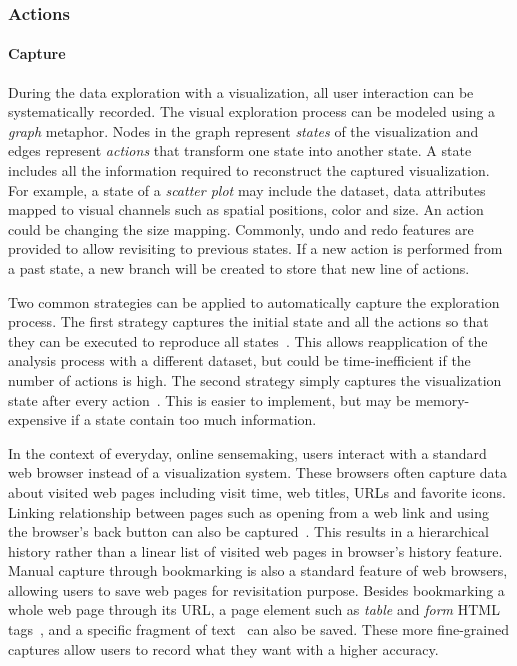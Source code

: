 \subsubsection{Actions}

\paragraph{Capture}
During the data exploration with a visualization, all user interaction can be systematically recorded. The visual exploration process can be modeled using a \textit{graph} metaphor. Nodes in the graph represent \textit{states} of the visualization and edges represent \textit{actions} that transform one state into another state. A state includes all the information required to reconstruct the captured visualization. For example, a state of a \textit{scatter plot} may include the dataset, data attributes mapped to visual channels such as spatial positions, color and size. An action could be changing the size mapping. Commonly, undo and redo features are provided to allow revisiting to previous states. If a new action is performed from a past state, a new branch will be created to store that new line of actions. 

Two common strategies can be applied to automatically capture the exploration process. The first strategy captures the initial state and all the actions so that they can be executed to reproduce all states~\cite{Kadivar2009}. This allows reapplication of the analysis process with a different dataset, but could be time-inefficient if the number of actions is high. The second strategy simply captures the visualization state after every action~\cite{Bavoil2005}. This is easier to implement, but may be memory-expensive if a state contain too much information.

In the context of everyday, online sensemaking, users interact with a standard web browser instead of a visualization system. These browsers often capture data about visited web pages including visit time, web titles, URLs and favorite icons. Linking relationship between pages such as opening from a web link and using the browser's back button can also be captured~\cite{Ayers1995,Hightower1998,Milic-Frayling2003}. This results in a hierarchical history rather than a linear list of visited web pages in browser's history feature. Manual capture through bookmarking is also a standard feature of web browsers, allowing users to save web pages for revisitation purpose. Besides bookmarking a whole web page through its URL, a page element such as \textit{table} and \textit{form} HTML tags~\cite{Hong2008}, and a specific fragment of text~\cite{Dontcheva2006} can also be saved. These more fine-grained captures allow users to record what they want with a higher accuracy. 

